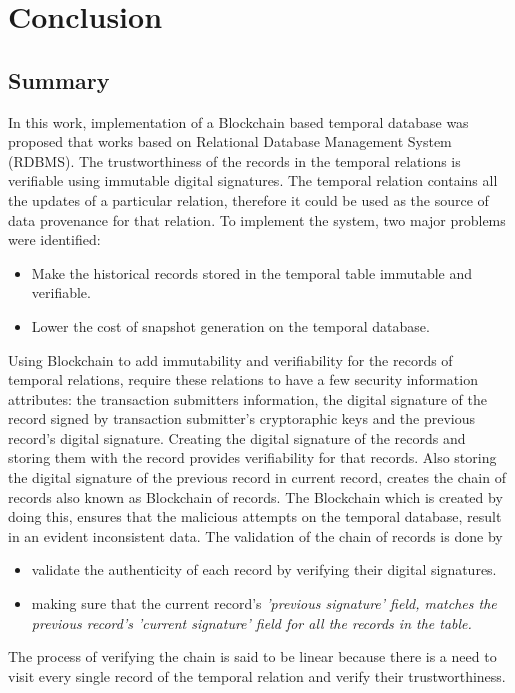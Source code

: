 \chapter{Conclusion}

	\section{Summary}
		In this work, implementation of a Blockchain based temporal database was proposed that works based on Relational Database Management System (RDBMS). The trustworthiness of the records in the temporal relations is verifiable using immutable digital signatures. The temporal relation contains all the updates of a particular relation, therefore it could be used as the source of data provenance for that relation. To implement the system, two major problems were identified: 
		
		\begin{itemize}
			\item Make the historical records stored in the temporal table immutable and verifiable.
			\item Lower the cost of snapshot generation on the temporal database.
		\end{itemize}

		Using Blockchain to add immutability and verifiability for the records of temporal relations, require these relations to have a few security information attributes: the transaction submitters information, the digital signature of the record signed by transaction submitter's cryptoraphic keys and the previous record's digital signature. Creating the digital signature of the records and storing them with the record provides verifiability for that records. Also storing the digital signature of the previous record in current record, creates the chain of records also known as Blockchain of records. The Blockchain which is created by doing this, ensures that the malicious attempts on the temporal database, result in an evident inconsistent data.
		The validation of the chain of records is done by
		\begin{itemize}
			\item validate the authenticity of each record by verifying their digital signatures.

			\item making sure that the current record's \it{'previous signature'} field, matches the previous record's \it{'current signature'} field for all the records in the table.
			
		\end{itemize}
		The process of verifying the chain is said to be linear because there is a need to visit every single record of the temporal relation and verify their trustworthiness.
		
